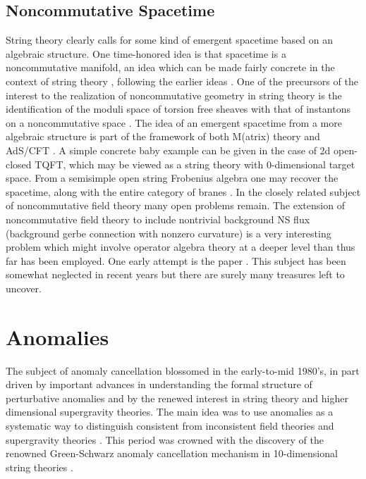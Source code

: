 \documentclass[12pt]{article}
\begin{document}
\subsection{Noncommutative Spacetime}

String theory clearly calls for some kind of emergent
spacetime based on an algebraic structure. One time-honored
idea is that spacetime is a noncommutative manifold, an idea which can
be made fairly concrete in the context of string theory
\cite{Douglas:2001ba,Konechny:2000dp,Konechny:2001wz,Seiberg:1999vs}, following the earlier ideas \cite{Connes:1997cr, Douglas:1997fm}. One of the precursors of the interest to the realization of noncommutative geometry in string theory is the identification
of the moduli space of torsion free sheaves with that of instantons on a noncommutative space \cite{NekrasovS:1998}.  
The idea of an emergent spacetime from a more algebraic structure 
is part of the framework of both M(atrix) theory \cite{Banks:1996vh} and AdS/CFT \cite{Aharony:1999ti}. A simple concrete baby example can be 
given in the case of 2d open-closed TQFT, which may be viewed as a string theory with $0$-dimensional target space. From a semisimple open string Frobenius algebra one may recover the spacetime, along with the entire category of branes \cite{Moore:2006dw}.
In the closely related subject of noncommutative field theory
\cite{Douglas:2001ba}
many open problems remain. The extension of noncommutative
field theory to include nontrivial background NS flux (background gerbe connection with nonzero curvature) is a very interesting
problem which might involve operator algebra theory at a deeper
level than thus far has been employed. One early attempt is
the paper \cite{Harvey:2000te}. This subject has been somewhat neglected in
recent years but there are surely many treasures left to uncover.

\section{Anomalies}
\label{sec:Anomalies}


The subject of anomaly cancellation blossomed in the early-to-mid 1980's,
in part driven by important advances in
understanding the formal structure of perturbative anomalies \cite{Zumino:1983rz}
and by the renewed interest in string theory and higher dimensional
supergravity theories. The main idea was to use anomalies as a systematic way to distinguish consistent
from inconsistent field theories and supergravity theories
\cite{Alvarez-Gaume:1983ihn,Witten:1985xe}. This period was crowned with the
discovery of the   renowned Green-Schwarz anomaly cancellation mechanism
in 10-dimensional string theories \cite{Green:1984sg}.
\end{document}

